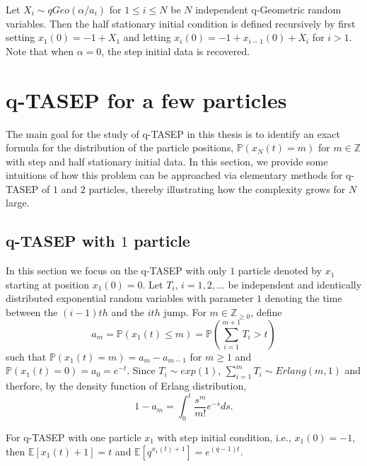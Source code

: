 Let $X_i \sim qGeo(\alpha/a_i)$ for $1 \le i \le N$ be $N$ independent q-Geometric random variables. Then the half stationary initial condition is defined recursively by first setting $x_1(0) = -1 + X_1$ and letting $x_i(0) = -1 + x_{i-1}(0) + X_i$ for $i > 1$. Note that when $\alpha = 0$, the step initial data is recovered.

\section{q-TASEP for a few particles}
The main goal for the study of q-TASEP in this thesis is to identify an exact formula for the distribution of the particle positions, $\mathbb{P}(x_N(t) = m)$ for $m \in \mathbb{Z}$ with step and half stationary initial data. In this section, we provide some intuitions of how this problem can be approached via elementary methods for q-TASEP of $1$ and $2$ particles, thereby illustrating how the complexity grows for $N$ large. 

\subsection{q-TASEP with $1$ particle}
In this section we focus on the q-TASEP with only $1$ particle denoted by $x_1$ starting at position $x_1(0) = 0$. Let $T_i$, $i = 1,2,\dots$ be independent and identically distributed exponential random variables with parameter $1$ denoting the time between the $(i-1)th$ and the $ith$ jump. For $m \in \mathbb{Z}_{\ge 0}$, define $$a_m = \mathbb{P}(x_1(t) \le m) = \mathbb{P}(\sum_{i=1}^{m+1} T_i > t)$$ such that $\mathbb{P}(x_1(t) = m) = a_m - a_{m-1}$ for $m \ge 1$ and $\mathbb{P}(x_1(t) = 0) = a_0 = e^{-t}$. Since $T_i \sim exp(1)$, $\sum_{i=1}^{m} T_i \sim Erlang(m,1)$ and therfore, by the density function of Erlang distribution, $$1 - a_m = \int_0^t \frac{s^m}{m!} e^{-s} ds.$$ 

\begin{proposition}
For q-TASEP with one particle $x_1$ with step initial condition, i.e., $x_1(0) = -1$, then $\mathbb{E}[x_1(t)+1] = t$ and $\mathbb{E}[q^{x_1(t)+1}] = e^{(q-1)t}$.
\end{proposition}

